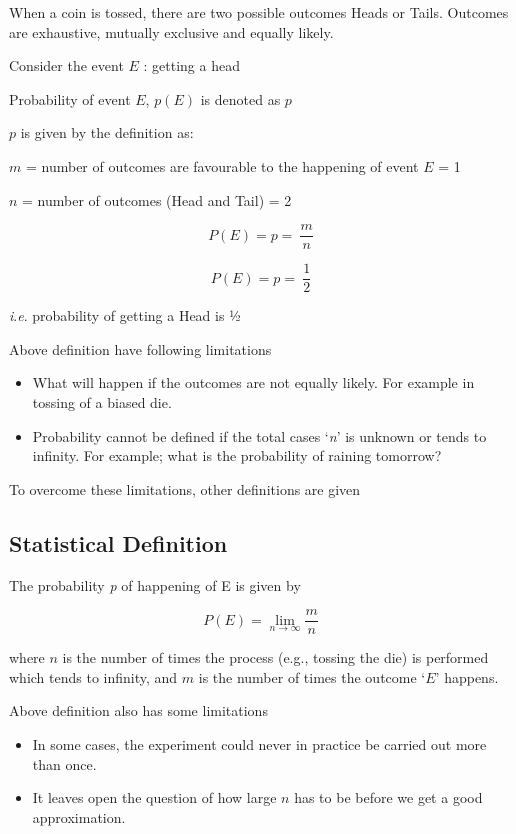\documentclass[
]{book}
\begin{document}
When a coin is tossed, there are two possible outcomes Heads or Tails. Outcomes are exhaustive, mutually exclusive and equally likely.

Consider the event \(E\) : getting a head

Probability of event \(E\), \(p(E)\) is denoted as \(p\)

\(p\) is given by the definition as:

\(m\) = number of outcomes are favourable to the happening of event \(E\) = 1

\(n\) = number of outcomes (Head and Tail) = 2

\[P\left( E \right) = p = \ \frac{m}{n}\]

\[P\left( E \right) = p = \ \frac{1}{2}\]

\emph{i}.\emph{e}. probability of getting a Head is ½

Above definition have following limitations

\begin{itemize}
\item
  What will happen if the outcomes are not equally likely. For example
  in tossing of a biased die.
\item
  Probability cannot be defined if the total cases `\emph{n}' is unknown or
  tends to infinity. For example; what is the probability of raining
  tomorrow?
\end{itemize}

To overcome these limitations, other definitions are given

\hypertarget{statistical-definition}{%
\subsection{Statistical Definition}\label{statistical-definition}}

The probability \textquotesingle{}\emph{p}\textquotesingle{} of happening of E is given by

\[P\left( E \right) = \lim_{n \rightarrow \infty}\frac{m}{n}\]

where \(n\) is the number of times the process (e.g., tossing the die) is
performed which tends to infinity, and \(m\) is the number of times the
outcome `\(E\)' happens.

Above definition also has some limitations

\begin{itemize}
\item
  In some cases, the experiment could never in practice be carried out
  more than once.
\item
  It leaves open the question of how large \(n\) has to be before we get
  a good approximation.
\end{itemize}
\end{document}
